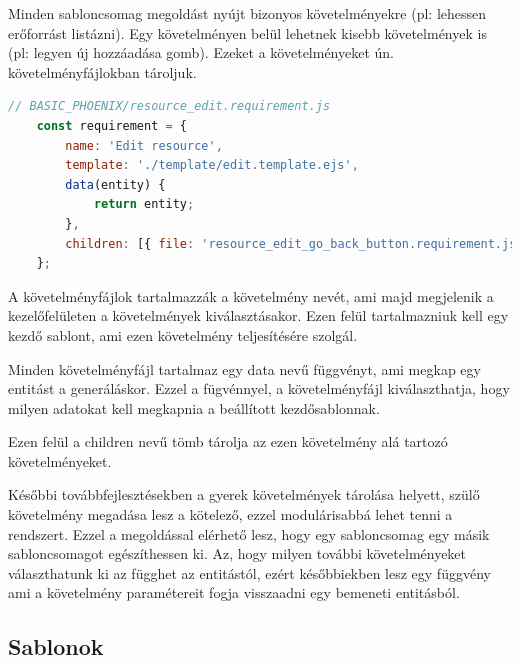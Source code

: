 \documentclass[a4paper,12pt,oneside]{report}
\begin{document}
\begin{justify}

	Minden sabloncsomag megoldást nyújt bizonyos követelményekre (pl: lehessen erőforrást listázni). Egy követelményen belül lehetnek kisebb követelmények is (pl: legyen új hozzáadása gomb). Ezeket a követelményeket ún. követelményfájlokban tároljuk. 

	\begin{lstlisting}[language=javascript]
	// BASIC_PHOENIX/resource_edit.requirement.js
	const requirement = {
		name: 'Edit resource',
		template: './template/edit.template.ejs',
		data(entity) {
			return entity;
		},
		children: [{ file: 'resource_edit_go_back_button.requirement.js' }]
	};
	\end{lstlisting}

	A követelményfájlok tartalmazzák a követelmény nevét, ami majd megjelenik a kezelőfelületen a követelmények kiválasztásakor. Ezen felül tartalmazniuk kell egy kezdő sablont, ami ezen követelmény teljesítésére szolgál.

	Minden követelményfájl tartalmaz egy data nevű függvényt, ami megkap egy entitást a generáláskor. Ezzel a fügvénnyel, a követelményfájl kiválaszthatja, hogy milyen adatokat kell megkapnia a beállított kezdősablonnak. 

	Ezen felül a children nevű tömb tárolja az ezen követelmény alá tartozó követelményeket. 

	Későbbi továbbfejlesztésekben a gyerek követelmények tárolása helyett, szülő követelmény megadása lesz a kötelező, ezzel modulárisabbá lehet tenni a rendszert. Ezzel a megoldással elérhető lesz, hogy egy sabloncsomag egy másik sabloncsomagot egészíthessen ki. Az, hogy milyen további követelményeket választhatunk ki az függhet az entitástól, ezért későbbiekben lesz egy függvény ami a követelmény paramétereit fogja visszaadni egy bemeneti entitásból. 

\end{justify}

\newpage
\subsection{Sablonok}
\end{document}

